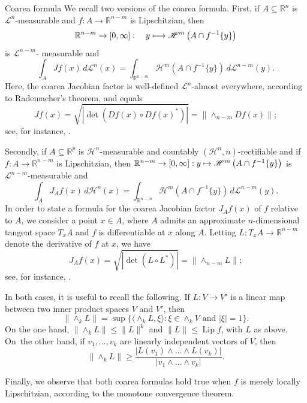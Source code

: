 \documentclass[JEP,XML,SOM,Unicode,ThmDefs,NoEqCountersInSection]{cedram}
\newcommand\mto{\mathchoice{\longmapsto}{\mapsto}{\mapsto}{\mapsto}}
\newenvironment{Empty}[2][\null]{%
\begin{enonce}[remark]{#1}#2}
{\end{enonce}}
\newcommand{\R}{\mathbb{R}}
\newcommand{\Rn}{\R^n}
\newcommand{\calH}{\mathscr{H}}
\newcommand{\calL}{\mathscr{L}}
\DeclareMathOperator{\rmLip}{\mathrm{Lip}}
\let\la\langle
\let\ra\rangle
\let\subset\subseteq
\begin{document}
\begin{Empty}[Coarea formula]
\label{coarea}
We recall two versions of the coarea formula.
First, if $A \subset \Rn$ is $\calL^n$-measurable and $f: A \to \R^{n-m}$ is Lipschitzian, then
\[
\R^{n-m} \to [0,\infty]:\quad y \mto \calH^m \left(A \cap f^{-1}\{y\} \right)
\]
is $\calL^{n-m}$- measurable and
\begin{equation*}
\int_A Jf(x) \,d\calL^n(x) = \int_{\R^{n-m}} \calH^m(A \cap f^{-1}\{y \}) \,d\calL^{n-m}(y).
\end{equation*}
Here, the coarea Jacobian factor is well-defined $\calL^n$-almost everywhere, according to Rademacher's theorem, and equals
\begin{equation*}
Jf(x) = \sqrt{ \left| \det \left(Df(x) \circ Df(x)^*\right)\right|} =\| {\wedge}_{n-m} Df(x)\| ;
\end{equation*}
see, for instance, \cite[Chap.\,3, \S 4]{EVANS.GARIEPY}.
\par
Secondly, if $A \subset \R^p$ is $\calH^n$-measurable and countably $(\calH^n,n)$-rectifiable and if $f: A \to \R^{n-m}$ is Lipschitzian, then $\R^{n-m} \to [0,\infty]: y \mto \calH^m \left(A \cap f^{-1}\{y\} \right)$ is $\calL^{n-m}$-measurable and
\begin{equation*}
\int_A J_Af(x) \,d\calH^n(x) = \int_{\R^{n-m}} \calH^m(A \cap f^{-1}\{y \}) \,d\calL^{n-m}(y).
\end{equation*}
In order to state a formula for the coarea Jacobian factor $J_Af(x)$ of $f$ relative to $A$, we consider a point $x \in A$, where $A$ admits an approximate $n$-dimensional tangent space $T_xA$ and $f$ is differentiable at $x$ along $A$.
Letting $L: T_x A \to \R^{n-m}$ denote the derivative of $f$ at $x$, we have
\begin{equation*}
J_Af(x) = \sqrt{ \left| \det \left(L \circ L^*\right)\right|} =\|{\wedge}_{n-m} L\| ;
\end{equation*}
see, for instance, \cite[3.2.22]{GMT}.
\par
In both cases, it is useful to recall the following.
If $L: V \to V'$ is a linear map between two inner product spaces $V$ and $V'$, then
\begin{equation}
\label{eq.11}
\|{\wedge}_k L \| = \sup\{ \la \wedge_k L, \xi \ra: \xi \in \wedge_k V \text{ and } |\xi| = 1\}.
\end{equation}
On the one hand, $\|{\wedge}_k L\| \leq \|L\|^k$ \cite[1.7.6]{GMT} and $\|L\| \leq \rmLip f$, with $L$ as above.
On~the other hand, if $v_1,\ldots,v_k$ are linearly independent vectors of $V$, then
\begin{equation}
\label{eq.12}
\|{\wedge}_k L \| \geq \frac{|L(v_1)\wedge \ldots \wedge L(v_k)|}{|v_1 \wedge \ldots \wedge v_k|}.
\end{equation}
\par
Finally, we observe that both coarea formulas hold true when $f$ is merely locally Lipschitzian, according to the monotone convergence theorem.
\end{Empty}
\end{document}

